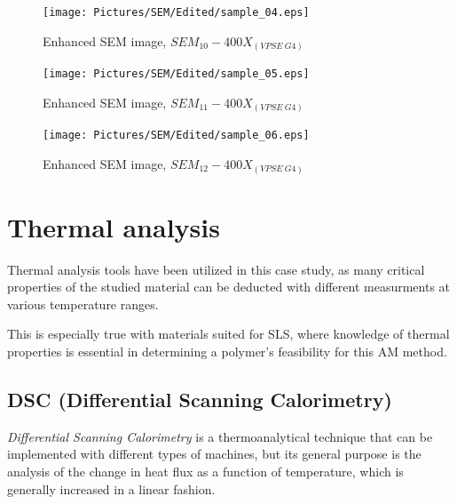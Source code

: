 \documentclass{article}
\begin{document}
                \begin{figure}[h!]
                    \centering 
                    \texttt{[image: Pictures/SEM/Edited/sample\_04.eps]}
                    \caption{Enhanced SEM image, $SEM_{10}-400X_{(VPSE \ G4)}$ \autocites{Pixelmator_Pro}{GIMP}}
                    \label{fig:SEM_10}
                \end{figure}

                \begin{figure}[h!]
                    \centering 
                    \texttt{[image: Pictures/SEM/Edited/sample\_05.eps]}
                    \caption{Enhanced SEM image, $SEM_{11}-400X_{(VPSE \ G4)}$ \autocites{Pixelmator_Pro}{GIMP}}
                    \label{fig:SEM_11}
                \end{figure}

                \begin{figure}[h!]
                    \centering 
                    \texttt{[image: Pictures/SEM/Edited/sample\_06.eps]}
                    \caption{Enhanced SEM image, $SEM_{12}-400X_{(VPSE \ G4)}$ \autocites{Pixelmator_Pro}{GIMP}}
                    \label{fig:SEM_12}
                \end{figure}
    \clearpage
    \section{Thermal analysis\label{Thermal_analysis}}
    
    Thermal analysis tools have been utilized in this case study, as many critical properties of the studied material 
    can be deducted with different measurments at various temperature ranges. 

    This is especially true with materials suited for SLS, where knowledge of thermal properties is 
    essential in determining a polymer's feasibility for this AM method. 

        \subsection{DSC (Differential Scanning Calorimetry)\label{DSC_analysis}}
        
        \textit{Differential Scanning Calorimetry} is a thermoanalytical technique that can be implemented with different types of machines, 
        but its general purpose is the analysis of the change in heat flux as a function of temperature, which is generally increased in 
        a linear fashion. 
        
\end{document}
